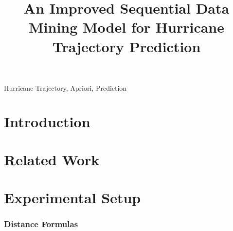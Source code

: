 \documentclass[conference]{IEEEtran}
\begin{document}
\raggedbottom

\title{An Improved Sequential Data Mining Model for Hurricane Trajectory Prediction}


\author{
}

\maketitle

\begin{abstract}

\end{abstract}

\begin{IEEEkeywords}
Hurricane Trajectory, Apriori, Prediction
\end{IEEEkeywords}

\IEEEpeerreviewmaketitle

\section{Introduction}

\section{Related Work}


\section{Experimental Setup}

\subsubsection{Distance Formulas}

\end{document}
